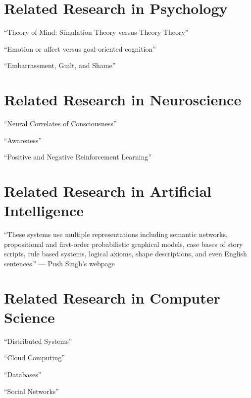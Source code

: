 \chapter{Related Research in Psychology}

``Theory of Mind: Simulation Theory versus Theory Theory''

``Emotion or affect versus goal-oriented cognition''

``Embarrassment, Guilt, and Shame''

\chapter{Related Research in Neuroscience}

``Neural Correlates of Consciousness''

``Awareness''

``Positive and Negative Reinforcement Learning''

\chapter{Related Research in Artificial Intelligence}

``These systems use multiple representations including semantic networks, propositional and first-order probabilistic graphical models, case bases of story scripts, rule based systems, logical axioms, shape descriptions, and even English sentences.'' --- Push Singh's webpage


\chapter{Related Research in Computer Science}

``Distributed Systems''

``Cloud Computing''

``Databases''

``Social Networks''

